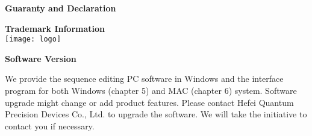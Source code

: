 \newpage
\pagestyle{fancy}
\renewcommand{\headrulewidth}{2.4pt}
\renewcommand{\footrulewidth}{2.4pt}
\chead{}
\cfoot{}
\fancyfoot[RO,LE]{\xiaosi\textbf{\thepage}}



\erhao \textbf{Guaranty and Declaration}
\vspace{0.7cm}

\sihao \textbf{Trademark Information}\\
\hspace*{0.8cm}
\hspace{-12.2cm}\texttt{[image: logo]}

\vspace{0.8cm}
\sihao\textbf{Software Version}
\vspace{0.4cm}

\hspace{-0.2cm}We provide the sequence editing PC software in Windows and the interface program for both Windows (chapter 5) and MAC (chapter 6) system. Software upgrade might change or add product features. Please contact Hefei Quantum Precision Devices Co., Ltd. to upgrade the software. We will take the initiative to contact you if  necessary.

